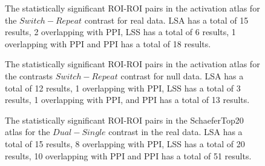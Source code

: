 \documentclass[phd,figures,tables,ackpage,abstractpage,publicabstractpage]{uithesis}
\begin{document}
\begin{figure}[H]
  \ContinuedFloat
  \centering


  \caption[All contrasts for all atlases for all data for LSA/LSS versus PPI continued...]{
      The statistically significant ROI-ROI pairs in the activation atlas
      for the $Switch - Repeat$ contrast for real data.
      LSA has a total of 15 results, 2 overlapping with PPI,
      LSS has a total of 6 results, 1 overlapping with PPI and
      PPI has a total of 18 results.
  }
  \label{fig:data-real_type-brain_atlas-activation_contrast-switchxrepeat}
\end{figure}

\begin{figure}[H]
  \ContinuedFloat
  \centering


  \caption[All contrasts for all atlases for all data for LSA/LSS versus PPI continued...]{
      The statistically significant ROI-ROI pairs in the activation atlas
      for the contrasts $Switch - Repeat$ contrast for null data.
      LSA has a total of 12 results, 1 overlapping with PPI,
      LSS has a total of 3 results, 1 overlapping with PPI,
      and PPI has a total of 13 results.
  }
  \label{fig:data-null_type-brain_atlas-activation_contrast-switchxrepeat}
\end{figure}
\begin{figure}[H]
  \centering


  \caption[All contrasts for all atlases for all data for LSA/LSS versus PPI continued...]{
      The statistically significant ROI-ROI pairs in the SchaeferTop20 atlas
      for the $Dual - Single$ contrast in the real data.
      LSA has a total of 15 results, 8 overlapping with PPI,
      LSS has a total of 20 results, 10 overlapping with PPI and
      PPI has a total of 51 results.
  }
  \label{fig:data-real_type-brain_atlas-schaeferbest_contrast-dualxsingle}
\end{figure}
\end{document}
